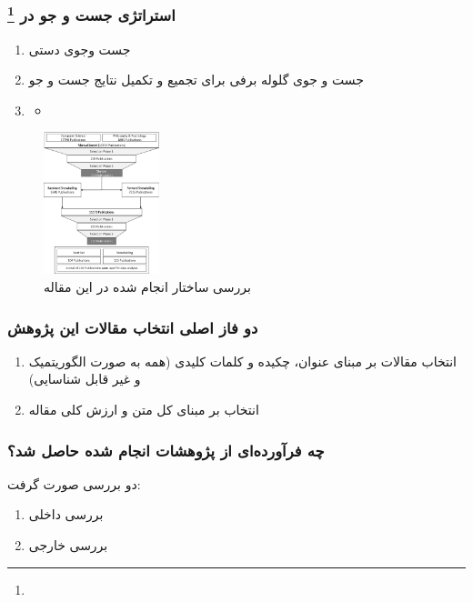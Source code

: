 \documentclass[10pt, a4paper]{beamer}
\begin{document}
\begin{frame}
    \frametitle{استراتژی جست و جو در  \footnote{}}
    \begin{enumerate}
        \item جست وجوی دستی
        \item جست و جوی گلوله برفی برای تجمیع و تکمیل نتایج جست و جو
        \item \begin{itemize}
            \item {}
        \end{itemize}
    \end{enumerate}

    \begin{figure}[H]
        \centering
        \includegraphics[width=0.3\textwidth]{images/slr_order.png}
        \caption{بررسی ساختار  انجام شده در این مقاله}
        \label{fig:slrOrder}
    \end{figure}
\end{frame}

\begin{frame}
    \frametitle{دو فاز اصلی انتخاب مقالات این پژوهش}

    \begin{enumerate}
        \item انتخاب مقالات بر مبنای عنوان، چکیده و کلمات کلیدی (همه به صورت
        الگوریتمیک و غیر قابل شناسایی)
        \item انتخاب بر مبنای کل متن و ارزش کلی مقاله
    \end{enumerate}
\end{frame}

\begin{frame}
    \frametitle{چه فرآورده‌ای از پژوهشات انجام شده حاصل شد؟}
    دو بررسی صورت گرفت:
    \begin{enumerate}
        \item بررسی داخلی
        \item بررسی خارجی
    \end{enumerate}
\end{frame}
\end{document}
